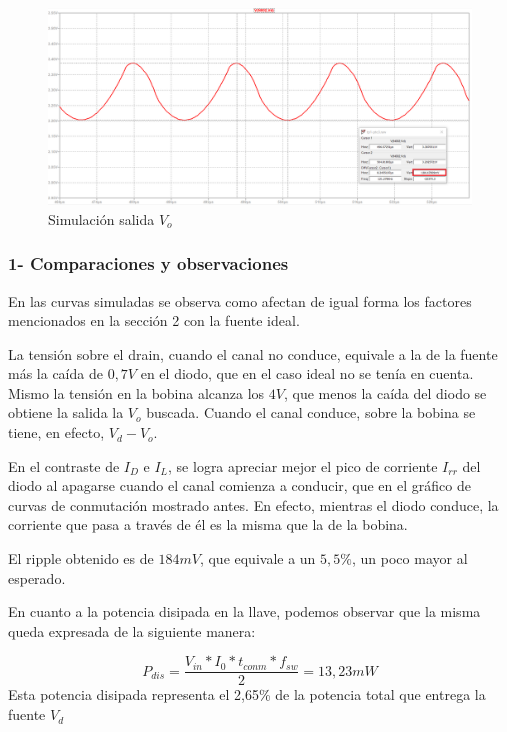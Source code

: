 \documentclass[e4_tp1_main.tex]{subfiles}
\begin{document}
\begin{figure}[H]
\centering
\includegraphics[width=0.9\linewidth]{Imagenes/Punto3/Vo.png}
\caption{Simulación salida $V_o$}
\end{figure}

\subsubsection*{1- Comparaciones y observaciones}

En las curvas simuladas se observa como afectan de igual forma los factores mencionados en la sección 2 con la fuente ideal.\par
La tensión sobre el drain, cuando el canal no conduce, equivale a la de la fuente más la caída de $0,7V$ en el diodo, que en el caso ideal no se tenía en cuenta. Mismo la tensión en la bobina alcanza los $4V$, que menos la caída del diodo se obtiene la salida la $V_o$ buscada. Cuando el canal conduce, sobre la bobina se tiene, en efecto, $V_d-V_o$.
\par
En el contraste de $I_D$ e $I_L$, se logra apreciar mejor el pico de corriente $I_{rr}$ del diodo al apagarse cuando el canal comienza a conducir, que en el gráfico de curvas de conmutación mostrado antes. En efecto, mientras el diodo conduce, la corriente que pasa a través de él es la misma que la de la bobina.
\par
El ripple obtenido es de $184mV$, que equivale a un $5,5\%$, un poco mayor al esperado.
\par
En cuanto a la potencia disipada en la llave, podemos observar que la misma queda expresada de la siguiente manera:\par
\[ P_{dis} = \frac{V_{in}*I_0*t_{conm}*f_{sw}}{2} = 13,23 mW  \] 
Esta potencia disipada representa el 2,65\% de la potencia total que entrega la fuente $V_d$

\newpage
\end{document}
